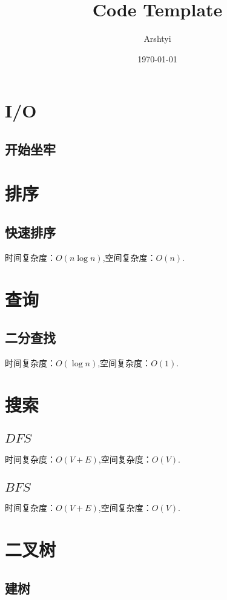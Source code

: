 \documentclass{code}
\title{\Huge{Code Template}}
\author{\huge{Arshtyi}}
\date{\today}
\newcommand{\fzd}[1]{\ensuremath{O\left(#1\right)}}
\newcommand{\code}[1]{}
\begin{document}
\maketitle
\newpage
{}
\setcounter{page}{1}
\pagestyle{plain}
\tableofcontents
\newpage
\setcounter{page}{1}
\pagestyle{fancy}
\fancyhf{}
\fancyhead[L]{\leftmark}
\fancyhead[R]{\thepage}
\section{I/O}
\subsection{开始坐牢}
\code{main}
\newpage
\section{排序}
\subsection{快速排序}
时间复杂度：\fzd{n \log n},空间复杂度：\fzd{n}.
\code{QuickSort}
\newpage
\section{查询}
\subsection{二分查找}
时间复杂度：\fzd{\log n},空间复杂度：\fzd{1}.
\code{BinarySearch}
\newpage
\section{搜索}
\subsection{\texorpdfstring{$DFS$}{DFS}}
时间复杂度：\fzd{V + E},空间复杂度：\fzd{V}.
\code{DFS}
\subsection{\texorpdfstring{$BFS$}{BFS}}
时间复杂度：\fzd{V + E},空间复杂度：\fzd{V}.
\code{BFS}
\newpage
\section{二叉树}
\subsection{建树}
\end{document}
